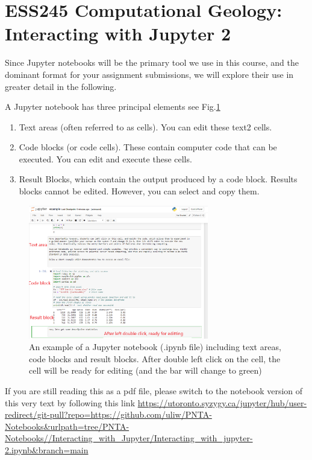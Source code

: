 \documentclass[svgnames, 11pt, lettersize]{article}
\author{Uli Wortmann}
\date{\today}
\title{}
\begin{document}
\section{ESS245 Computational Geology: Interacting with Jupyter 2}
\label{sec:org2990cfc}
Since Jupyter notebooks will be the primary tool we use in this
course, and the dominant format for your assignment submissions, we
will explore their use in greater detail in the following.

A Jupyter notebook has three principal elements see Fig.\ref{nbexample}

\begin{enumerate}
\item Text areas (often referred to as cells). You can edit these text2 cells.
\item Code blocks (or code cells). These contain computer code that can
be executed. You can edit and execute these cells.
\item Result Blocks, which contain the output produced by a code
block. Results blocks cannot be edited. However, you can select and
copy them.
\end{enumerate}
\begin{figure}[htbp]
\centering
\includegraphics[width=0.7\textwidth]{./Tianshi/TL-fig-003.png}
\caption{\label{nbexample}An example of a Jupyter notebook (.ipynb file) including text areas, code blocks and result blocks. After double left click on the cell, the cell will be ready for editing (and the bar will change to green)}
\end{figure}

If you are still reading this as a pdf file, please switch to the notebook
version of this very text by following this link
\url{https://utoronto.syzygy.ca/jupyter/hub/user-redirect/git-pull?repo=https://github.com/uliw/PNTA-Notebooks\&urlpath=tree/PNTA-Notebooks//Interacting\_with\_Jupyter/Interacting\_with\_jupyter-2.ipynb\&branch=main}
\end{document}

